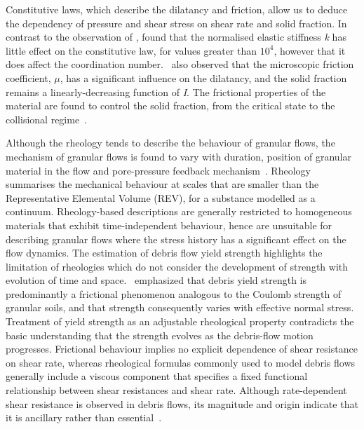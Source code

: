 
Constitutive laws, which describe the dilatancy and friction, allow us to 
deduce the dependency of pressure and shear stress on shear rate and solid 
fraction. In contrast to the observation of \citet{Campbell2002}, 
\citet{DaCruz2005} found that the normalised elastic stiffness \textit{k} has 
little effect on the constitutive law, for values greater than $10^{4}$, 
however that it does affect the coordination number.~\citet{DaCruz2005} also 
observed that the microscopic friction coefficient, $\mu$, has a significant 
influence on the dilatancy, and the solid fraction remains a 
linearly-decreasing function of \textit{I}. The 
frictional properties of the material are found to control the solid fraction, 
from the critical state to the collisional regime~\citep{DaCruz2005}. 

Although the rheology tends to describe the behaviour of granular flows, the 
mechanism of granular flows is found to vary with duration, position of 
granular material in the flow and pore-pressure feedback 
mechanism~\citep{Iverson2003}. Rheology summarises the mechanical behaviour at 
scales that are smaller than the Representative Elemental Volume (REV), 
for a substance modelled as a continuum. Rheology-based descriptions are 
generally restricted to homogeneous materials that exhibit time-independent 
behaviour, hence are unsuitable for describing granular flows where the stress 
history has a significant effect on the flow dynamics. The estimation of debris 
flow yield strength highlights the limitation of rheologies which do not 
consider the development of strength with evolution of time and 
space.~\citet{Johnson1965} emphasized that debris yield strength is 
predominantly a frictional phenomenon analogous to the Coulomb strength of 
granular soils, and that strength consequently varies with effective normal 
stress. Treatment of yield strength as an adjustable rheological property 
contradicts the basic understanding that the strength evolves as the 
debris-flow motion progresses. Frictional behaviour implies no explicit 
dependence of shear resistance on shear rate, whereas rheological formulas 
commonly used to model debris flows generally include a viscous component that 
specifies a fixed functional relationship between shear resistances and shear 
rate. Although rate-dependent shear resistance is observed in debris flows, its 
magnitude and origin indicate that it is ancillary rather than 
essential~\citep{Iverson2003}.

